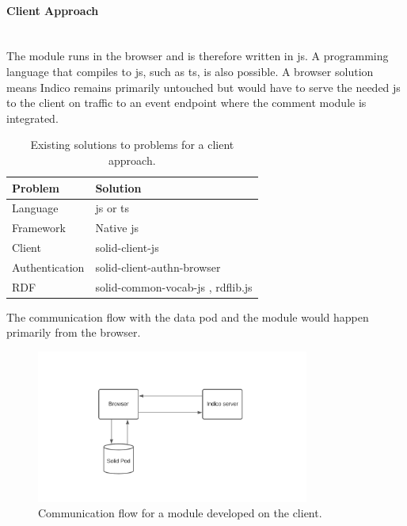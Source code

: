 \paragraph{Client Approach}\mbox{}\\

The module runs in the browser and is therefore written in \gls{js}. A programming language that compiles to \gls{js}, such as \gls{ts}, is also possible. A browser solution means Indico remains primarily untouched but would have to serve the needed \gls{js} to the client on traffic to an event endpoint where the comment module is integrated.

\begin{table}[h!]
    \centering
    \begin{tabular}{| l | l |} 
     \hline
     Problem & Solution \\
     \hline
      Language & \gls{js} or \gls{ts}  \\
      Framework & Native \gls{js}  \\
      Client & solid-client-js \cite{solid-client-js}  \\
      Authentication & solid-client-authn-browser \cite{solid-client-authn-browser} \\
      RDF & solid-common-vocab-js \cite{solid-common-vocab-js}, rdflib.js \cite{rdflib.js}  \\
     \hline
    \end{tabular}
    \vspace{0.75cm}
    \caption{Existing solutions to problems for a client approach.}
    \label{table:1}
\end{table}

The communication flow with the data pod and the module would happen primarily from the browser.

\begin{figure}[H]
    \centering
    \includegraphics[width=0.8\textwidth]{prototype/graphs/poc-infrastructure-frontend.jpeg}
    \caption{Communication flow for a module developed on the client.}
    \label{fig:poc-infrastructure-frontend}
\end{figure}
\vspace{0.5cm}

